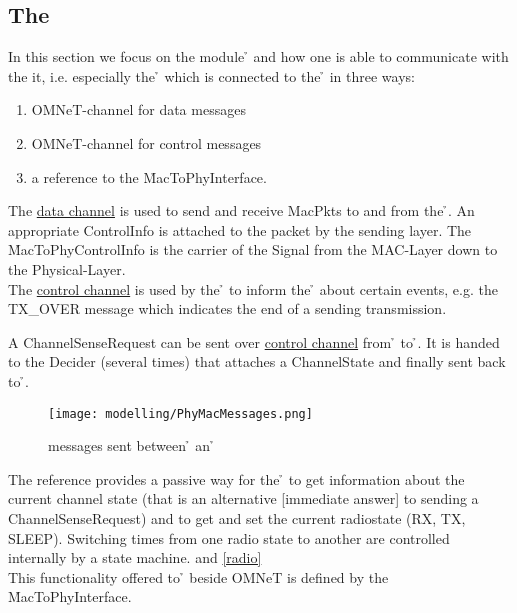 \subsection{The \bp}

In this section we focus on the module \h{\bp} and how one is able to communicate with the 
it, i.e. especially the \h{\bm} which is connected to the \h{\bp}
in three ways:

\begin{enumerate}
 \item OMNeT-channel for data messages
 \item OMNeT-channel for control messages
 \item a reference to the \h{MacToPhyInterface}.
\end{enumerate} 

The \underline{data channel} is used to send and receive
MacPkts to and
from the \h{\bp}. An appropriate ControlInfo is attached to the packet by the
sending layer. The \h{MacToPhyControlInfo} is the carrier of the Signal from the
MAC-Layer down to the Physical-Layer.
\\

The \underline{control channel} is used by the \h{\bp} to inform the \h{\bm}
about
certain events, e.g. the TX\_OVER message 
which indicates the end of a sending transmission.

A ChannelSenseRequest can be sent over \underline{control channel} from \h{\bm}
to \h{\bp}. It is handed to the Decider (several times) that attaches a
ChannelState and finally sent back to \h{\bm}.
\begin{figure}[H]
 \centering
 \texttt{[image: modelling/PhyMacMessages.png]}
 \caption{messages sent between \h{\bp} an \h{\bm}}
 \label{fig: PhyMacMessages}
\end{figure}


The reference provides a passive way for the  \h{\bm} to 
get
information about the current channel state (that is an
alternative [immediate answer] to sending a ChannelSenseRequest) and to
get and set the current radiostate (RX,
TX,
SLEEP).
Switching times from one radio state to another are
controlled
internally by a state machine.  and \ref{radio}
\\
This functionality offered to \h{\bm} beside OMNeT is defined by the \h{MacToPhyInterface}.
\\

